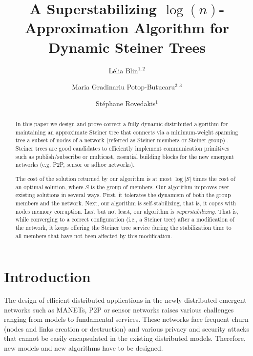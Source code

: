 \documentclass[11pt]{article}
\begin{document}
\title{A Superstabilizing $\log(n)$-Approximation Algorithm for Dynamic Steiner Trees}

\author{
L\'{e}lia Blin$^{1,2}$ 
\and
Maria Gradinariu Potop-Butucaru$^{2,3}$
\and
St\'{e}phane Rovedakis$^1$
}



\date{}


\maketitle

\begin{abstract}
In this paper we design and prove correct a fully dynamic distributed algorithm for maintaining an approximate Steiner 
 tree that connects via a minimum-weight spanning tree a 
subset of nodes of a network (referred as Steiner members or Steiner group) .
Steiner trees are good 
candidates to efficiently implement communication primitives such
as publish/subscribe or multicast, essential building blocks for the new
emergent networks (e.g. P2P, sensor or adhoc networks). 

The cost
of the solution returned by our algorithm is at most $\log |S|$
times the cost of an optimal solution, where $S$ is the group of
members. Our algorithm improves over existing solutions in several
ways. First, it tolerates the dynamism of both the group members and
the network. Next, our algorithm is self-stabilizing, that is, it
copes with nodes memory
corruption. Last but not least, our algorithm is
\emph{superstabilizing}. 
That is, while converging to a correct
configuration (i.e., a Steiner tree) after a modification of the
network, it keeps offering the Steiner tree service during the
stabilization time to all members that have not been affected by
this modification.
\end{abstract}





\section{Introduction}

The design of efficient distributed applications in the newly distributed 
emergent networks such as MANETs, P2P or sensor networks raises 
various challenges ranging 
from models to fundamental services. These networks face frequent
churn (nodes and links creation or destruction) and various privacy
and security attacks that cannot be easily encapsulated in the
existing distributed models. 
Therefore, new models and new algorithms have to be designed. 
\end{document}
